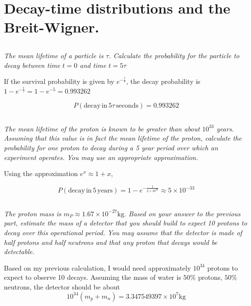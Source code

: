 \documentclass{article}
\begin{document}
\newpage

\section{Decay-time distributions and the Breit-Wigner.}
\subsection{}
\textit{The mean lifetime of a particle is $\tau$. Calculate the probability for the particle to decay between time $t=0$ and time $t=5 \tau$}


If the survival probability is given by $e^{-\frac{t}{\tau}}$, the decay probability is $1-e^{-\frac{t}{\tau}} = 1-e^{-5}= 0.993262$


$$\boxed{P(\mathrm{decay \, in } \,5\tau\, \mathrm{seconds}) =0.993262 }$$

\subsection{}
\textit{The mean lifetime of the proton is known to be greater than about $10^{33}$ years. Assuming that this value is in fact the mean lifetime of the proton, calculate the probability for one proton to decay during a 5 year period over which an experiment operates. You may use an appropriate approximation.}

Using the approximation $e^x \approx 1 + x$,

$$\boxed{P(\mathrm{decay \, in } \,5\, \mathrm{years}) =1-e^{-\frac{1}{2\times 10^{32}}}\approx 5 \times 10^{-33} }$$

\subsection{}
\textit{The proton mass is $m_{P} \approx 1.67 \times 10^{-27} \mathrm{kg} .$ Based on your answer to the previous part, estimate the mass of a detector that you should build to expect 10 protons to decay over this operational period. You may assume that the detector is made of half protons and half neutrons and that any proton that decays would be detectable.}

Based on my previous calculation, I would need approximately $10^{34}$ protons to expect to observe 10 decays. Assuming the mass of water is $50\%$ protons, $50\%$ neutrons, the detector should be about 
$$\boxed{10^{34} (m_p + m_n) = 3.347549397\times 10^7\text{kg}}$$
\end{document}
